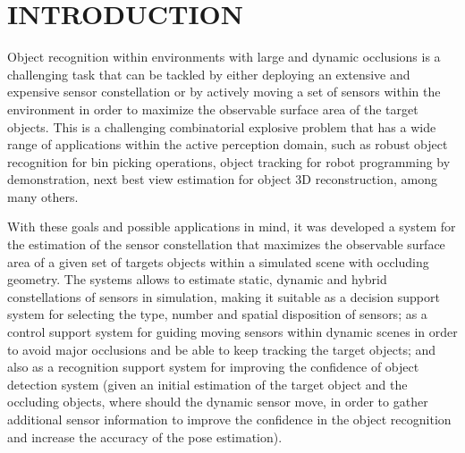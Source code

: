\section{\uppercase{Introduction}}\label{sec:introduction}


\noindent Object recognition within environments with large and dynamic occlusions is a challenging task that can be tackled by either deploying an extensive and expensive sensor constellation or by actively moving a set of sensors within the environment in order to maximize the observable surface area of the target objects. This is a challenging combinatorial explosive problem that has a wide range of applications within the active perception domain, such as robust object recognition for bin picking operations, object tracking for robot programming by demonstration, next best view estimation for object 3D reconstruction, among many others.

With these goals and possible applications in mind, it was developed a system for the estimation of the sensor constellation that maximizes the observable surface area of a given set of targets objects within a simulated scene with occluding geometry. The systems allows to estimate static, dynamic and hybrid constellations of sensors in simulation, making it suitable as a decision support system for selecting the type, number and spatial disposition of sensors; as a control support system for guiding moving sensors within dynamic scenes in order to avoid major occlusions and be able to keep tracking the target objects; and also as a recognition support system for improving the confidence of object detection system (given an initial estimation of the target object and the occluding objects, where should the dynamic sensor move, in order to gather additional sensor information to improve the confidence in the object recognition and increase the accuracy of the pose estimation).

